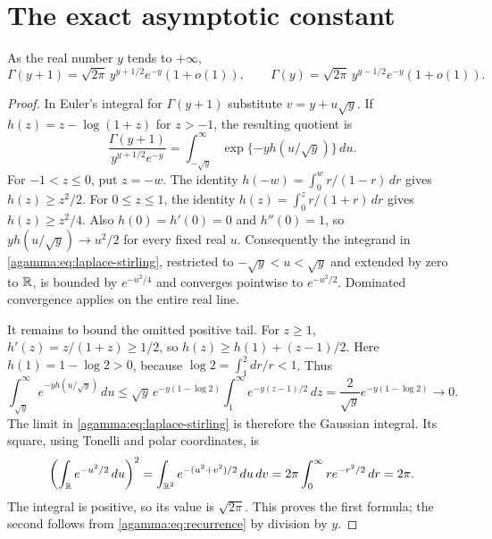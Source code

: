 \documentclass[11pt]{article}
\begin{document}
\section{The exact asymptotic constant}\label{agamma:sec:stirling}
\begin{agammalemma}\label{agamma:lem:stirling}
As the real number $y$ tends to $+\infty$,
\begin{equation}\label{agamma:eq:stirling}
\Gamma(y+1)=\sqrt{2\pi}\,y^{y+1/2}e^{-y}(1+o(1)),
\qquad
\Gamma(y)=\sqrt{2\pi}\,y^{y-1/2}e^{-y}(1+o(1)).
\end{equation}
\end{agammalemma}
\begin{proof}
In Euler's integral for $\Gamma(y+1)$ substitute $v=y+u\sqrt y$.
If $h(z)=z-\log(1+z)$ for $z>-1$, the resulting quotient is
\begin{equation}\label{agamma:eq:laplace-stirling}
\frac{\Gamma(y+1)}{y^{y+1/2}e^{-y}}
=\int_{-\sqrt y}^{\infty}\exp\{-y h(u/\sqrt y)\}\,du.
\end{equation}
For $-1<z\le0$, put $z=-w$. The identity
$h(-w)=\int_0^w r/(1-r)\,dr$ gives $h(z)\ge z^2/2$.
For $0\le z\le1$, the identity
$h(z)=\int_0^z r/(1+r)\,dr$ gives $h(z)\ge z^2/4$.
Also $h(0)=h'(0)=0$ and $h''(0)=1$, so
$y h(u/\sqrt y)\to u^2/2$ for every fixed real $u$.
Consequently the integrand in \eqref{agamma:eq:laplace-stirling}, restricted
to $-\sqrt y<u<\sqrt y$ and extended by zero to $\mathbb R$, is bounded
by $e^{-u^2/4}$ and converges pointwise to $e^{-u^2/2}$.
Dominated convergence applies on the entire real line.

It remains to bound the omitted positive tail. For $z\ge1$,
$h'(z)=z/(1+z)\ge1/2$, so
$h(z)\ge h(1)+(z-1)/2$. Here $h(1)=1-\log2>0$, because
$\log2=\int_1^2 dr/r<1$. Thus
\begin{equation}\label{agamma:eq:stirling-tail}
\int_{\sqrt y}^{\infty}e^{-y h(u/\sqrt y)}\,du
\le \sqrt y\,e^{-y(1-\log2)}
\int_1^{\infty}e^{-y(z-1)/2}\,dz
=\frac2{\sqrt y}e^{-y(1-\log2)}\longrightarrow0.
\end{equation}
The limit in \eqref{agamma:eq:laplace-stirling} is therefore the Gaussian
integral. Its square, using Tonelli and polar coordinates, is
\[
\left(\int_{\mathbb R}e^{-u^2/2}\,du\right)^2
=\int_{\mathbb R^2}e^{-(u^2+v^2)/2}\,du\,dv
=2\pi\int_0^\infty r e^{-r^2/2}\,dr=2\pi.
\]
The integral is positive, so its value is $\sqrt{2\pi}$.
This proves the first formula; the second follows from
\eqref{agamma:eq:recurrence} by division by $y$.
\end{proof}
\end{document}
